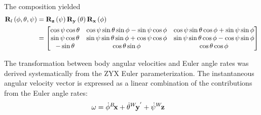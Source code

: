 The composition yielded
\begin{align}
	\lrdmatr{R}{l}\left(\scal{\phi},\scal{\theta},\scal{\psi}\right) & =
	\lrdmatr{R}{\vect{z}}\left(\scal{\psi}\right)
	\lrdmatr{R}{\vect{y}}\left(\scal{\theta}\right)
	\lrdmatr{R}{\vect{x}}\left(\scal{\phi}\right)                        \\
	                                                                 & =
	\begin{bmatrix}
		\cos{\scal{\psi}} \cos{\scal{\theta}}                                                         &
		\cos{\scal{\psi}} \sin{\scal{\theta}} \sin{\scal{\phi}} - \sin{\scal{\psi}} \cos{\scal{\phi}} &
		\cos{\scal{\psi}} \sin{\scal{\theta}} \cos{\scal{\phi}} + \sin{\scal{\psi}} \sin{\scal{\phi}}   \\
		\sin{\scal{\psi}} \cos{\scal{\theta}}                                                         &
		\sin{\scal{\psi}} \sin{\scal{\theta}} \sin{\scal{\phi}} + \cos{\scal{\psi}} \cos{\scal{\phi}} &
		\sin{\scal{\psi}} \sin{\scal{\theta}} \cos{\scal{\phi}} - \cos{\scal{\psi}} \sin{\scal{\phi}}   \\
		-\sin{\scal{\theta}}                                                                          &
		\cos{\scal{\theta}} \sin{\scal{\phi}}                                                         &
		\cos{\scal{\theta}} \cos{\scal{\phi}}
	\end{bmatrix}
	\label{eq:rov_rotation_matrix_final}
\end{align}

The transformation  between body angular velocities and Euler angle rates was derived
systematically from the ZYX Euler parameterization. The instantaneous angular velocity vector is
expressed as a linear combination of the contributions from the Euler angle rates:
\begin{align}
	\vect{\omega} & = \dot{\phi}\fvect{x}{B} + \dot{\theta}\fluvect{y}{W}{'} + \dot{\psi}\fvect{z}{W}
	\label{rcc_rcm_srd_angle_composition}
\end{align}

